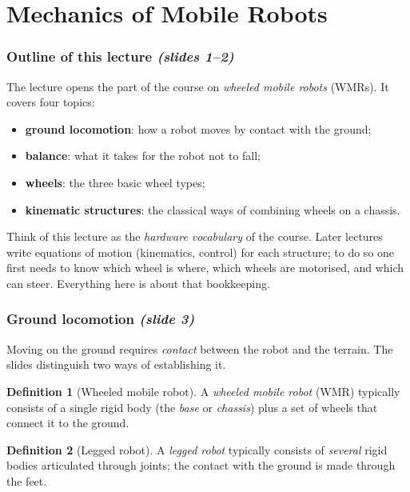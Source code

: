 \documentclass[11pt,a4paper]{article}
\theoremstyle{definition}
\newtheorem{definition}{Definition}[section]
\theoremstyle{plain}
\theoremstyle{remark}
\begin{document}
\part{Mechanics of Mobile Robots}
 
\section{Outline of this lecture \emph{(slides 1--2)}}
 
The lecture opens the part of the course on \emph{wheeled mobile robots} (WMRs). It covers four topics:
\begin{itemize}[nosep]
  \item \textbf{ground locomotion}: how a robot moves by contact with the ground;
  \item \textbf{balance}: what it takes for the robot not to fall;
  \item \textbf{wheels}: the three basic wheel types;
  \item \textbf{kinematic structures}: the classical ways of combining wheels on a chassis.
\end{itemize}
 
\begin{intuition}
Think of this lecture as the \emph{hardware vocabulary} of the course. Later lectures write equations of motion (kinematics, control) for each structure; to do so one first needs to know which wheel is where, which wheels are motorised, and which can steer. Everything here is about that bookkeeping.
\end{intuition}
 
\section{Ground locomotion \emph{(slide 3)}}

Moving on the ground requires \emph{contact} between the robot and the terrain. The slides distinguish two ways of establishing it.

\begin{definition}[Wheeled mobile robot]
A \emph{wheeled mobile robot} (WMR) typically consists of a single rigid body (the \emph{base} or \emph{chassis}) plus a set of wheels that connect it to the ground.
\end{definition}

\begin{definition}[Legged robot]
A \emph{legged robot} typically consists of \emph{several} rigid bodies articulated through joints; the contact with the ground is made through the feet.
\end{definition}
\end{document}
